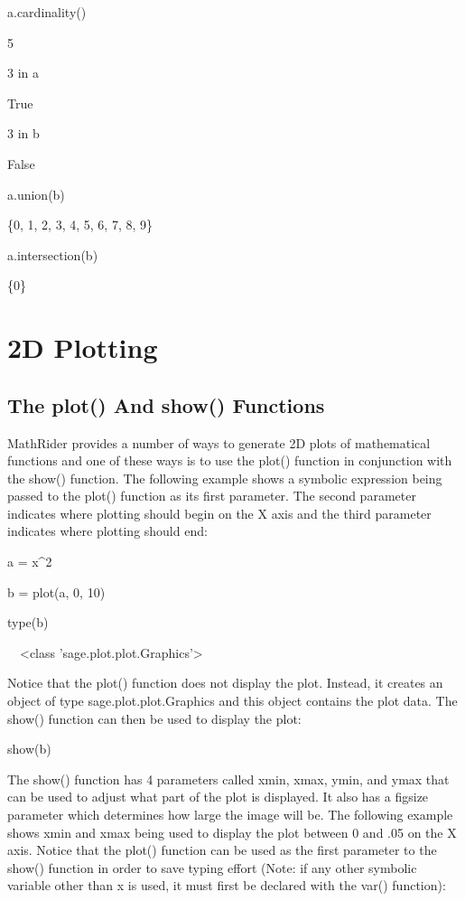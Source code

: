 \documentclass[12pt,oneside]{book}
\begin{document}
a.cardinality()

{\textbar}

5


3 in a

{\textbar}

True


3 in b

{\textbar}

False


a.union(b)

{\textbar}

\{0, 1, 2, 3, 4, 5, 6, 7, 8, 9\}


a.intersection(b)

{\textbar}

\{0\}

\chapter[2D Plotting]{2D Plotting}

\section[The plot() And show() Functions]{The plot() And show() Functions}

MathRider provides a number of ways to generate 2D plots of mathematical functions and one of these ways is to use the plot() function in conjunction with the show() function. The following example shows a symbolic expression being passed to the plot() function as its first parameter. The second parameter indicates where plotting should begin on the X axis and the third parameter indicates where plotting should end:

a = x\^{}2

b = plot(a, 0, 10)

type(b)

{\textbar}

\ \ {\textless}class 'sage.plot.plot.Graphics'{\textgreater}


Notice that the plot() function does not display the plot. Instead, it creates an object of type sage.plot.plot.Graphics and this object contains the plot data. The show() function can then be used to display the plot: 

show(b)

{\textbar}


The show() function has 4 parameters called xmin, xmax, ymin, and ymax that can be used to adjust what part of the plot is displayed. It also has a figsize parameter which determines how large the image will be. The following example shows xmin and xmax being used to display the plot between 0 and .05 on the X axis. Notice that the plot() function can be used as the first parameter to the show() function in order to save typing effort (Note: if any other symbolic variable other than x is used, it must first be declared with the var() function): 
\end{document}
